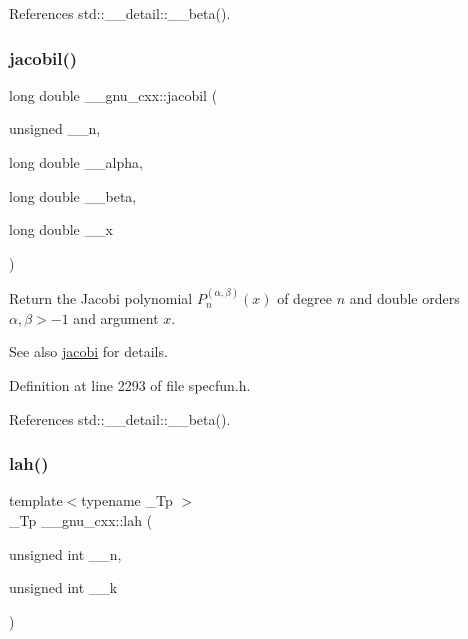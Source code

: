 References std\+::\+\_\+\+\_\+detail\+::\+\_\+\+\_\+beta().

\mbox{\label{group__gnu__math__spec__func_ga2898a5ebf451eaf259ecfcdd171aa72b}} 
\subsubsection{\texorpdfstring{jacobil()}{jacobil()}}
{\footnotesize\ttfamily long double \+\_\+\+\_\+gnu\+\_\+cxx\+::jacobil (\begin{DoxyParamCaption}\item[{unsigned}]{\+\_\+\+\_\+n,  }\item[{long double}]{\+\_\+\+\_\+alpha,  }\item[{long double}]{\+\_\+\+\_\+beta,  }\item[{long double}]{\+\_\+\+\_\+x }\end{DoxyParamCaption})\hspace{0.3cm}{\ttfamily [inline]}}

Return the Jacobi polynomial $ P_n^{(\alpha,\beta)}(x) $ of degree $ n $ and { double} orders $ \alpha, \beta > -1 $ and argument $ x $.

\begin{DoxySeeAlso}{See also}
\hyperlink{group__gnu__math__spec__func_gad54f6601748324d268532138eb38ca33}{jacobi} for details. 
\end{DoxySeeAlso}


Definition at line 2293 of file specfun.\+h.



References std\+::\+\_\+\+\_\+detail\+::\+\_\+\+\_\+beta().

\mbox{\label{group__gnu__math__spec__func_gaa3491fabb0a6ef54a946a7a23ca866c7}} 
\subsubsection{\texorpdfstring{lah()}{lah()}\hspace{0.1cm}{\footnotesize\ttfamily [1/2]}}
{\footnotesize\ttfamily template$<$typename \+\_\+\+Tp $>$ \\
\+\_\+\+Tp \+\_\+\+\_\+gnu\+\_\+cxx\+::lah (\begin{DoxyParamCaption}\item[{unsigned int}]{\+\_\+\+\_\+n,  }\item[{unsigned int}]{\+\_\+\+\_\+k }\end{DoxyParamCaption})\hspace{0.3cm}{\ttfamily [inline]}}

